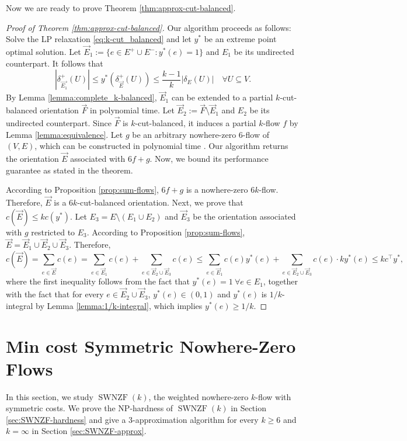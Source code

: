 \documentclass[11pt]{article}
\begin{document}
Now we are ready to prove Theorem \ref{thm:approx-cut-balanced}. 
\begin{proof}[Proof of Theorem \ref{thm:approx-cut-balanced}]
Our algorithm proceeds as follows:  Solve the LP relaxation \eqref{eq:k-cut_balanced} and let $y^*$ be an extreme point optimal solution. Let $\vec{E}_1:=\{e\in E^+\cup E^-: y^*(e)=1\}$ and $E_1$ be its undirected counterpart. It follows that 
\[|\delta_{\vec{E_1}}^+(U)|\leq y^*(\delta_{\vec{E}}^+(U))\leq \frac{k-1}{k}|\delta_E(U)|\quad \forall U\subseteq V.\]
By Lemma \ref{lemma:complete_k-balanced}, $\vec{E}_1$ can be extended to a partial $k$-cut-balanced orientation $\vec{F}$ in polynomial time. Let $\vec{E}_2:=\vec{F}\setminus \vec{E}_1$ and $E_2$ be its undirected counterpart. Since $\vec{F}$ is $k$-cut-balanced, it induces a partial $k$-flow $f$ by Lemma \ref{lemma:equivalence}. Let $g$ be an arbitrary nowhere-zero $6$-flow of $(V,E)$, which can be constructed in polynomial time \cite{younger1983integer}. Our algorithm returns the orientation $\vec{E}$ associated with $6f+g$. Now, we bound its performance guarantee as stated in the theorem. 


    According to Proposition \ref{prop:sum-flows}, $6f+g$ is a nowhere-zero $6k$-flow. Therefore, $\vec{E}$ is a $6k$-cut-balanced orientation.
    Next, we prove that $c(\vec{E})\leq k c(y^*)$. Let $E_3=E\setminus (E_1\cup E_2)$ and $\vec{E}_3$ be the orientation associated with $g$ restricted to $E_3$. According to Proposition \ref{prop:sum-flows}, $\vec{E}=\vec{E}_1\cup \vec{E}_2\cup\vec{E}_3$. Therefore, 
    \[
c(\vec{E})=\sum_{e\in \vec{E}} c(e)=\sum_{e\in \vec{E}_1} c(e)+\sum_{e\in \vec{E}_2\cup \vec{E}_3} c(e)\leq \sum_{e\in \vec{E}_1} c(e)y^*(e)+\sum_{e\in \vec{E}_2\cup \vec{E}_3} c(e)\cdot ky^*(e)\leq kc^\top y^*,
\]
where the first inequality follows from the fact that $y^*(e)=1\ \forall e\in E_1$, together with the fact that for every $e\in \vec{E}_2\cup \vec{E}_3$, $y^*(e)\in(0,1)$ and $y^*(e)$ is $1/k$-integral by Lemma \ref{lemma:1/k-integral}, which implies $y^*(e)\geq 1/k$. 
\end{proof}










\section{Min cost Symmetric Nowhere-Zero Flows}\label{sec:SWNZF}
In this section, we study $\operatorname{SWNZF}(k)$, the weighted nowhere-zero $k$-flow with symmetric costs. We prove the NP-hardness of $\operatorname{SWNZF}(k)$ in Section \ref{sec:SWNZF-hardness} and give a $3$-approximation algorithm for every $k\geq 6$ and $k=\infty$ in Section \ref{sec:SWNZF-approx}.
\end{document}
